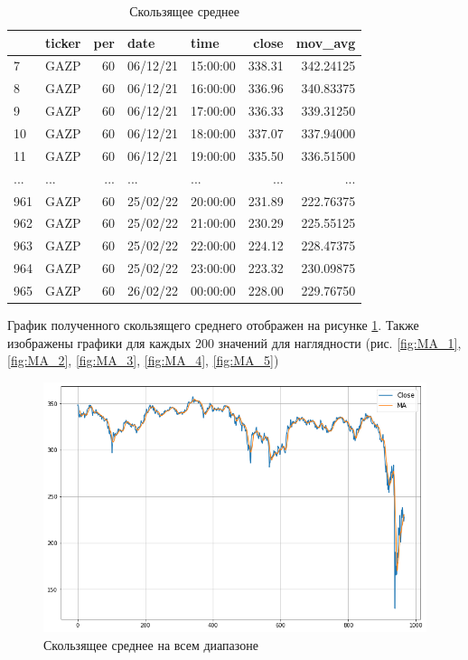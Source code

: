 \documentclass[14pt,a4paper]{extarticle}%
\begin{document}
\begin{table}[H]
  \centering
  \begin{tabular}{llrllrr}
    \toprule
    {} & ticker &  per &      date &      time &   close &    mov\_avg \\
    \midrule
    7  &   GAZP &   60 &  06/12/21 &  15:00:00 &  338.31 &  342.24125 \\
    8  &   GAZP &   60 &  06/12/21 &  16:00:00 &  336.96 &  340.83375 \\
    9  &   GAZP &   60 &  06/12/21 &  17:00:00 &  336.33 &  339.31250 \\
    10 &   GAZP &   60 &  06/12/21 &  18:00:00 &  337.07 &  337.94000 \\
    11 &   GAZP &   60 &  06/12/21 &  19:00:00 &  335.50 &  336.51500 \\
    ... &   ... &   ... &  ... &  ... &  ... &  ... \\
    961 &   GAZP &   60 &  25/02/22 &  20:00:00 &  231.89 &  222.76375 \\
    962 &   GAZP &   60 &  25/02/22 &  21:00:00 &  230.29 &  225.55125 \\
    963 &   GAZP &   60 &  25/02/22 &  22:00:00 &  224.12 &  228.47375 \\
    964 &   GAZP &   60 &  25/02/22 &  23:00:00 &  223.32 &  230.09875 \\
    965 &   GAZP &   60 &  26/02/22 &  00:00:00 &  228.00 &  229.76750 \\
    \bottomrule
  \end{tabular}
  \caption{Скользящее среднее}
  \label{table:data_per_hour_MA}
\end{table}

График полученного скользящего среднего отображен на рисунке \ref{fig:MA_full}.
Также изображены графики для каждых 200 значений для наглядности
(рис. \ref{fig:MA_1}, \ref{fig:MA_2}, \ref{fig:MA_3}, \ref{fig:MA_4}, \ref{fig:MA_5})

\begin{figure}[H]
  \centering
  \includegraphics[scale=0.5]{MA_full.png}
  \caption{Скользящее среднее на всем диапазоне}
  \label{fig:MA_full}
\end{figure}
\end{document}
